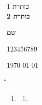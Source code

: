 \documentclass[12pt]{article}
\begin{document}
\begin{titlepage}
\begin{center}
\setRL
\H

\textsc{\LARGE כותרת 1}
\\[1.5cm]


{ \huge \bfseries כותרת 2
\\[0.4cm] }


\begin{minipage}{0.4\textwidth}
\begin{flushleft} \large
שם
\end{flushleft}
\end{minipage}
\begin{minipage}{0.4\textwidth}
\begin{flushright} \large
123456789
\end{flushright}
\end{minipage}

\vfill

{\large \today}

\end{center}
\end{titlepage}
\setRL
\H
\begin{enumerate}
\item[.1]
\begin{enumerate}
\item[א.]

\end{enumerate}
\end{enumerate}
\unsetRL
\end{document}
